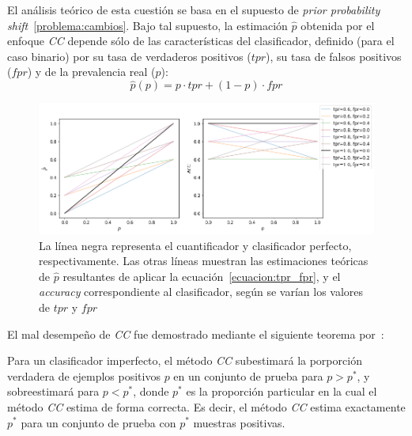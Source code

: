 El análisis teórico de esta cuestión se basa en el supuesto de {\it prior
probability shift\/}~\ref{problema:cambios}. Bajo tal supuesto, la estimación
$\hat p$ obtenida por el enfoque {\it CC\/} depende sólo de las características
del clasificador, definido (para el caso binario) por su tasa de verdaderos
positivos ($tpr$), su tasa de falsos positivos ($fpr$) y de la prevalencia real
($p$):
\begin{equation}\label{ecuacion:tpr_fpr}
    \hat p(p) = p \cdot {tpr} + (1-p) \cdot {fpr}
\end{equation}
\begin{figure}[H]
    \includegraphics[width=\textwidth]{../plots_teoria/cc_tpr_fpr.png}
    \caption{La línea negra representa el cuantificador y clasificador perfecto,
    respectivamente. Las otras líneas muestran las estimaciones teóricas de
    $\hat p$ resultantes de aplicar la ecuación~\ref{ecuacion:tpr_fpr}, y el
    {\it accuracy\/} correspondiente al clasificador, según se varían los
    valores de $tpr$ y $fpr$}\label{fig:cc_tpr_fpr}
\end{figure}

El mal desempeño de {\it CC\/} fue demostrado mediante el siguiente teorema
por~\citet{forman2008quantifying}:

\begin{theorem}
    \citep[p.169]{forman2008quantifying}\label{teorema:forman} Para un
    clasificador imperfecto, el método {\it CC\/} subestimará la porporción
    verdadera de ejemplos positivos $p$ en un conjunto de prueba para $p>p^*$, y
    sobreestimará para $p<p^*$, donde $p^*$ es la proporción particular en la
    cual el método {\it CC\/} estima de forma correcta. Es decir, el método {\it
    CC\/} estima exactamente $p^*$ para un conjunto de prueba con $p^*$ muestras
    positivas.
\end{theorem}

